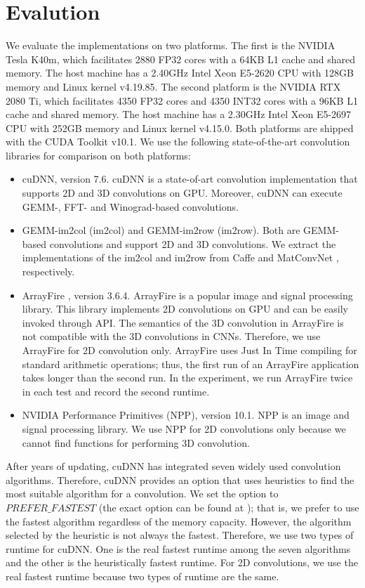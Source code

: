 \section{Evalution}
\label{exp}
We evaluate the implementations on two platforms. The first is the  NVIDIA Tesla K40m, which facilitates 2880 FP32 cores with a 64KB L1 cache and
shared memory. The host machine has a 2.40GHz Intel Xeon E5-2620 CPU with 128GB memory and Linux kernel v4.19.85. The second platform is the NVIDIA RTX 2080 Ti, which facilitates 4350 FP32 cores and 4350 INT32 cores with a 96KB L1 cache and shared memory. The host machine has a 2.30GHz Intel Xeon E5-2697
CPU with 252GB memory and Linux kernel v4.15.0. Both platforms are shipped with the CUDA Toolkit v10.1. We use the following state-of-the-art convolution libraries for comparison on both platforms:
\begin{itemize}
  \item cuDNN, version 7.6. cuDNN is a state-of-art convolution implementation that supports 2D and 3D convolutions on GPU.
      Moreover, cuDNN can execute GEMM-, FFT- and Winograd-based convolutions.
  \item GEMM-im2col (im2col) and GEMM-im2row (im2row). Both are GEMM-based convolutions and support 2D and 3D convolutions.
      We extract the implementations of the im2col and im2row from Caffe \cite{jia2014caffe} and MatConvNet \cite{vedaldi15matconvnet}, respectively.
  \item ArrayFire \cite{Yalamanchili2015}, version 3.6.4. ArrayFire is a popular image and signal processing library. This library implements 2D
      convolutions on GPU and can be easily invoked through API. The semantics of the 3D convolution in ArrayFire is not compatible with the 3D
      convolutions in CNNs. Therefore, we use ArrayFire for 2D convolution only. ArrayFire uses Just In Time compiling for standard
      arithmetic operations; thus, the first run of an ArrayFire application takes longer than the second run.
      In the experiment, we run ArrayFire twice in each test and record the second runtime.
  \item NVIDIA Performance Primitives (NPP), version 10.1. NPP is an image and signal processing library. We use NPP for 2D convolutions only because we cannot find functions for performing 3D convolution.

\end{itemize}

After years of updating, cuDNN has integrated seven widely used convolution algorithms. Therefore, cuDNN provides an option that uses
heuristics to find the most suitable algorithm for a convolution. We set the option to $PREFER\_FASTEST$ (the exact option can be found at
\cite{CUDAtoolkit}); that is, we prefer to use the fastest algorithm regardless of the memory capacity. However, the algorithm
selected by the heuristic is not always the fastest. Therefore, we use two types of runtime for cuDNN. One is the real fastest runtime
among the seven algorithms and the other is the heuristically fastest runtime. For 2D convolutions, we use the real fastest runtime because two types of runtime are the same.

